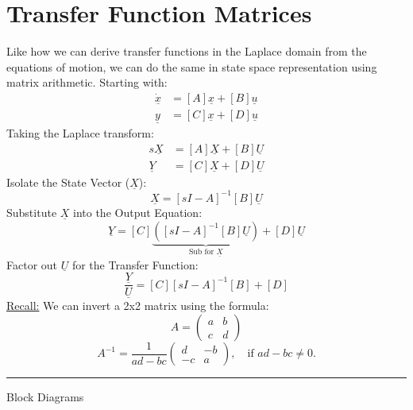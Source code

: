 \documentclass[12pt]{article}
\begin{document}
\section*{Transfer Function Matrices}
Like how we can derive transfer functions in the Laplace domain from the equations of motion, we can do the same in state space representation using matrix arithmetic. Starting with:
\[\begin{aligned}
\dot{\underline{x}} &= [A]{\underline{x}} + [B]\underline{u} \\
\underline{y} &= [C]{\underline{x}} + [D]\underline{u}
\end{aligned}\]
Taking the Laplace transform:
\[\begin{aligned}
    s\underline{X} &= [A]\underline{X} + [B]\underline{U} \\
     \underline{Y} &= [C]\underline{X} + [D]\underline{U}
\end{aligned}\]
Isolate the State Vector ($\underline{X}$):
\[\underline{X} = [sI - A]^{-1}[B]\underline{U}\]
Substitute $\underline{X}$ into the Output Equation:
\[\underline{Y} = [C]\underbrace{\left( [sI - A]^{-1}[B]\underline{U} \right)}_{\text{Sub for } \underline{X}} + [D]\underline{U}\]
Factor out $\underline{U}$ for the Transfer Function:
\[\boxed{\frac{\underline{Y}}{\underline{U}} = [C][sI - A]^{-1}[B] + [D]}\]
\underline{Recall:} We can invert a 2x2 matrix using the formula:
\[
A =
\begin{pmatrix}
a & b \\
c & d
\end{pmatrix}\]
\[A^{-1} = \frac{1}{ad - bc}
\begin{pmatrix}
d & -b \\
-c & a
\end{pmatrix},
\quad \text{if } ad - bc \neq 0.\]
\vspace{1em}
\noindent\hrule
\vspace{1em}
\newpage
\begin{center}
{\LARGE Block Diagrams\par}
\end{center}
\end{document}
